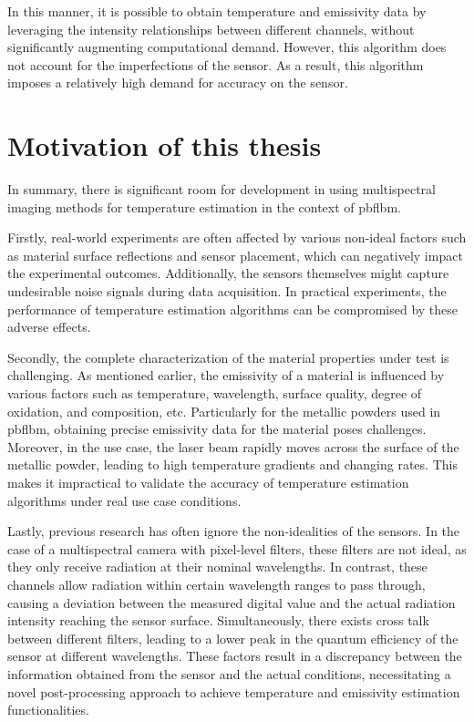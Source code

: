 In this manner, it is possible to obtain temperature and emissivity data 
by leveraging the intensity relationships between different channels, 
without significantly augmenting computational demand. However, this 
algorithm does not account for the imperfections of the sensor. As a 
result, this algorithm imposes a relatively high demand for accuracy 
on the sensor.


\section{Motivation of this thesis}
In summary, there is significant room for development in using 
multispectral imaging methods for temperature estimation in the 
context of \gls{pbflbm}. 


Firstly, real-world experiments are often affected by various non-ideal 
factors such as material surface reflections and sensor placement, 
which can negatively impact the experimental outcomes. Additionally, the 
sensors themselves might capture undesirable noise signals during data 
acquisition. In practical experiments, the performance of 
temperature estimation algorithms can be compromised by these adverse effects.


Secondly, the complete characterization of the material properties under 
test is challenging. As mentioned earlier, the emissivity of a material is 
influenced by various factors such as temperature, wavelength, surface 
quality, degree of oxidation, and composition, etc. Particularly for the 
metallic powders used in \gls{pbflbm}, obtaining precise emissivity data 
for the material poses challenges. Moreover, in the use case, 
the laser beam rapidly moves across the surface of the metallic powder, 
leading to high temperature gradients and changing rates. This makes it 
impractical to validate the accuracy of temperature estimation algorithms 
under real use case conditions.

Lastly, previous research has often ignore the non-idealities of the 
sensors. In the case of a multispectral camera with pixel-level filters, 
these filters are not ideal, as they only receive radiation at their 
nominal wavelengths. In contrast, these channels allow radiation within 
certain wavelength ranges to pass through, causing a deviation between 
the measured digital value and the actual radiation intensity reaching 
the sensor surface. Simultaneously, there exists cross talk between 
different filters, leading to a lower peak in the quantum efficiency of 
the sensor at different wavelengths. These factors result in a discrepancy 
between the information obtained from the sensor and the actual conditions, 
necessitating a novel post-processing approach to achieve temperature and 
emissivity estimation functionalities.


